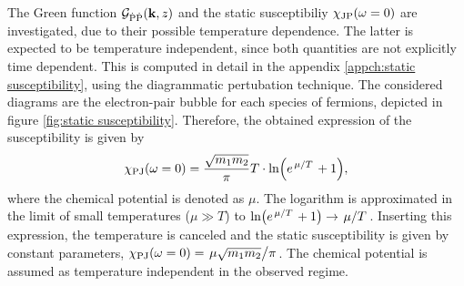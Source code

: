 The Green function $\mathcal{G}_{\dot{\mathrm{P}}\dot{\mathrm{P}}}(\vb{k}, z)$ and the static susceptibiliy $\chi_{\mathrm{JP}}(\omega = 0)$ are investigated, due to their possible temperature dependence.
The latter is expected to be temperature independent, since both quantities are not explicitly time dependent.
This is computed in detail in the appendix \ref{appch:static susceptibility}, using the diagrammatic pertubation technique.
The considered diagrams are the electron-pair bubble for each species of fermions, depicted in figure \ref{fig:static susceptibility}.
Therefore, the obtained expression of the susceptibility is given by
%
\begin{align}
	\chi_{\mt{PJ}}(\omega = 0) = \frac{\sqrt{m_{1} m_{2}}}{\pi} T \cdot \ln(e^{\flatfrac{\mu}{T}} + 1),
	\label{eq:static susceptibility computed}
\end{align}
%
where the chemical potential is denoted as $\mu$.
The logarithm is approximated in the limit of small temperatures ($\mu \gg T$) to $\ln(e^{\flatfrac{\mu}{T}} + 1) \rightarrow \flatfrac{\mu}{T}$.
Inserting this expression, the temperature is canceled and the static susceptibility is given by constant parameters, $\chi_{\mt{PJ}}(\omega = 0) = \flatfrac{\mu\sqrt{m_{1} m_{2}}}{\pi}$.
The chemical potential is assumed as temperature independent in the observed regime.

